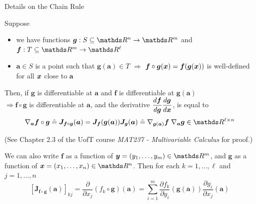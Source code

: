 \documentclass[11pt,compress,t,notes=noshow, xcolor=table]{beamer}
\begin{document}
\begin{framei}[fs=small]{Details on the Chain Rule}
\item Suppose\begin{itemize}
\item  we have functions $\boldsymbol{g}: S\subseteq\R^n \rightarrow \R^m$ and $\boldsymbol{f}: T\subseteq\R^m \rightarrow \R^{\ell}$
\item $\boldsymbol{a} \in S$ is a point such that $\boldsymbol{g}(\boldsymbol{a}) \in T$ $\Rightarrow$ $\boldsymbol{f} \circ \boldsymbol{g}(\bm{x})=\boldsymbol{f}(\boldsymbol{g}(\bm{x}))$ is well-defined for all $\bm{x}$ close to $\boldsymbol{a}$
\end{itemize}
\item Then, if $\boldsymbol{g}$ is differentiable at $\boldsymbol{a}$ and $\boldsymbol{f}$ is differentiable at $\boldsymbol{g}(\boldsymbol{a})$\\
$\Rightarrow\boldsymbol{f} \circ \boldsymbol{g}$ is differentiable at $\boldsymbol{a}$, and the derivative $\dfrac{d \boldsymbol f}{d \boldsymbol g} \dfrac{d \boldsymbol g}{d \bm{x}}$, is equal to
\begin{align*}
\nabla_{\boldsymbol{a}} \boldsymbol{f} \circ \boldsymbol{g}\;\hat{=}\;\boldsymbol{J}_{\boldsymbol{f} \circ \boldsymbol{g}}(\boldsymbol{a})=\boldsymbol{J}_{\boldsymbol{f}}(\boldsymbol{g}(\boldsymbol{a}))\boldsymbol{J}_ {\boldsymbol{g}}(\boldsymbol{a})\;\hat{=}\;\nabla_{\boldsymbol{g}(\boldsymbol{a})}{\boldsymbol{f}}\;\nabla_{\boldsymbol{a}} {\boldsymbol{g}}\in\R^{\ell\times n}
\end{align*}
\begin{footnotesize}
(See Chapter 2.3 of the UofT course \emph{MAT237 - Multivariable Calculus} for proof.) %
\end{footnotesize}
\item We can also write $\boldsymbol{f}$ as a function of $\yv=\left(y_1, \ldots, y_m\right) \in \R^m$, and $\boldsymbol{g}$ as a function of $\xv=\left(x_1, \ldots, x_n\right) \in \R^n$. Then for each $k=1, \ldots, \ell$ and $j=1, \ldots, n$
$$
\left[\boldsymbol{J}_{\boldsymbol{f} \circ \boldsymbol{g}}(\boldsymbol{a})\right]_{kj} = \frac{\partial}{\partial x_j}\left(f_k \circ \boldsymbol{g}\right)(\boldsymbol{a})=\sum_{i=1}^m \frac{\partial f_k}{\partial y_i}(\boldsymbol{g}(\boldsymbol{a})) \frac{\partial g_i}{\partial x_j}(\boldsymbol{a})
$$
\end{framei}
\end{document}

